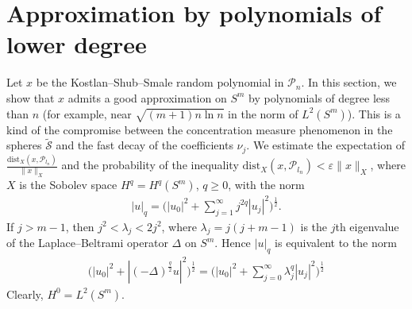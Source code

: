 \documentclass[10pt]{amsart}
\theoremstyle{remark}
\let\td=\tilde
\begin{document}
\section{Approximation by polynomials of lower degree}
Let $x$ be the Kostlan--Shub--Smale random polynomial in ${\mathcal{P}}_n$.
In this section, we show that $x$ admits a good approximation on
$S^m$ by polynomials of degree less than $n$ (for example, near
$\sqrt{(m+1)n\ln n}$ in the norm of $L^2(S^m)$). This is a kind of
the compromise between the concentration measure phenomenon in the
spheres $\td{\mathcal{S}}$ and the fast decay of the coefficients $\nu_j$.
We estimate the expectation of
$\frac{{\mathrm{dist}}_X(x,{\mathcal{P}}_{l_n})}{\|x\|_X}$ and the probability of the
inequality ${\mathrm{dist}}_X(x,{\mathcal{P}}_{l_n})<{{\mathord{\varepsilon}}}\|x\|_X$, where $X$ is the
Sobolev space $H^q=H^q(S^m)$,  $q\geq0$,
with the norm
\begin{eqnarray*}
|u|_q=\Big(|u_0|^2+\sum_{j=1}^\infty j^{2q}|u_j|^2\Big)^{\frac12}.
\end{eqnarray*}
If $j>m-1$, then $j^2<{{\mathord{\lambda}}}_j<2j^2$, where ${{\mathord{\lambda}}}_j=j(j+m-1)$ is the
$j$th eigenvalue of the Laplace--Beltrami operator ${{\mathord{\Delta}}}$ on $S^m$.
Hence $|u|_q$ is equivalent to the norm
\begin{eqnarray*}
\Big(|u_0|^2+|(-{{\mathord{\Delta}}})^{\frac{q}{2}}u|^2\Big)^{\frac12}
=\Big(|u_0|^2+\sum_{j=0}^\infty{{\mathord{\lambda}}}_j^q|u_j|^2\Big)^{\frac12}
\end{eqnarray*}
Clearly, $H^0=L^2(S^m)$.
\end{document}
